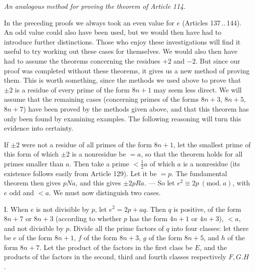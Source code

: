 \begin{center}\textit{An analogous method for proving the theorem of Article 114.}\end{center}

In the preceding proofs we always took an even value for $e$ (Articles 137\,..\,144). An odd value could also have been used, but we would then have had to introduce further distinctions. Those who enjoy these investigations will find it useful to try working out these cases for themselves. We would also then have had to assume the theorems concerning the residues $+2$ and $-2$. But since our proof was completed without these theorems, it gives us a new method of proving them. This is worth something, since the methods we used above to prove that $\pm2$ is a residue of every prime of the form $8n+1$ may seem less direct. We will assume that the remaining cases (concerning primes of the forms $8n+3$, $8n+5$, $8n+7$) have been proved by the methods given above, and that this theorem has only been found by examining examples. The following reasoning will turn this evidence into certainty.

If $\pm2$ were not a residue of all primes of the form $8n+1$, let the smallest prime of this form of which $\pm2$ is a nonresidue be $=a$, so that the theorem holds for all primes smaller than $a$. Then take a prime $<\frac{1}{2}a$ of which $a$ is a nonresidue (its existence follows easily from Article 129). Let it be $=p$. The fundamental theorem then gives $pNa$, and this gives $\pm2pRa$. --- So let $e^2\equiv2p\ (\mathrm{mod.}\ a)$, with $e$ odd and $<a$. We must now distinguish two cases.

I. When $e$ is not divisible by $p$, let $e^2=2p+aq$. Then $q$ is positive, of the form $8n+7$ or $8n+3$ (according to whether $p$ has the form $4n+1$ or $4n+3$), $<a$, and not divisible by $p$. Divide all the prime factors of $q$ into four classes: let there be $e$ of the form $8n+1$, $f$ of the form $8n+3$, $g$ of the form $8n+5$, and $h$ of the form $8n+7$. Let the product of the factors in the first class be $E$, and the products of the factors in the second, third and fourth classes respectively $F,G.H$.

